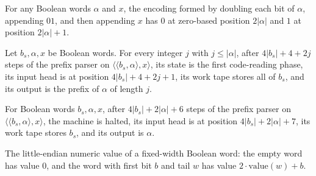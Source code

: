 \begin{lemma}
\label{Turing.timed_pair_separator}
\leanok
{}
For any Boolean words $\alpha$ and $x$, the encoding formed by doubling each bit of
$\alpha$, appending $01$, and then appending $x$ has $0$ at zero-based position
$2|\alpha|$ and $1$ at position $2|\alpha|+1$.
\end{lemma}

\begin{lemma}
\label{Turing.timedPrefix_code}
\leanok
{}
Let $b_s,\alpha,x$ be Boolean words. For every integer $j$ with $j\le |\alpha|$, after
$4|b_s|+4+2j$ steps of the prefix parser on $\langle\langle b_s,\alpha\rangle,x\rangle$,
its state is the first code-reading phase, its input head is at position
$4|b_s|+4+2j+1$, its work tape stores all of $b_s$, and its output is the prefix of
$\alpha$ of length $j$.
\end{lemma}

\begin{lemma}
\label{Turing.timedPrefix_complete}
\leanok
{}
For Boolean words $b_s,\alpha,x$, after $4|b_s|+2|\alpha|+6$ steps of the prefix parser
on $\langle\langle b_s,\alpha\rangle,x\rangle$, the machine is halted, its input head is
at position $4|b_s|+2|\alpha|+7$, its work tape stores $b_s$, and its output is
$\alpha$.
\end{lemma}

\begin{definition}
\label{Turing.timedValue}
\leanok
The little-endian numeric value of a fixed-width Boolean word: the empty word
has value $0$, and the word with first bit $b$ and tail $w$ has value
$2 \cdot \mathrm{value}(w) + b$.
\end{definition}

